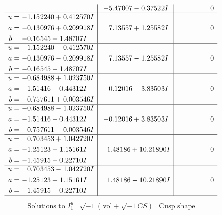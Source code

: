 \documentclass[1p]{elsarticle_modified}
\theoremstyle{definition}
\newcommand{\I}{\sqrt{-1}}
\begin{document}
$$\begin{array}{c|c|c}
 & -5.47007 - 0.37522 I & \phantom{-0.000000 } 0 \\ \hline\begin{aligned}
u &= -1.152240 + 0.412570 I \\
a &= -0.130976 + 0.209918 I \\
b &= -0.16545 + 1.48707 I\end{aligned}
 & \phantom{-}7.13557 + 1.25582 I & \phantom{-0.000000 } 0 \\ \hline\begin{aligned}
u &= -1.152240 - 0.412570 I \\
a &= -0.130976 - 0.209918 I \\
b &= -0.16545 - 1.48707 I\end{aligned}
 & \phantom{-}7.13557 - 1.25582 I & \phantom{-0.000000 } 0 \\ \hline\begin{aligned}
u &= -0.684988 + 1.023750 I \\
a &= -1.51416 + 0.44312 I \\
b &= -0.757611 + 0.003546 I\end{aligned}
 & -0.12016 - 3.83503 I & \phantom{-0.000000 } 0 \\ \hline\begin{aligned}
u &= -0.684988 - 1.023750 I \\
a &= -1.51416 - 0.44312 I \\
b &= -0.757611 - 0.003546 I\end{aligned}
 & -0.12016 + 3.83503 I & \phantom{-0.000000 } 0 \\ \hline\begin{aligned}
u &= \phantom{-}0.703453 + 1.042720 I \\
a &= -1.25123 - 1.15161 I \\
b &= -1.45915 - 0.22710 I\end{aligned}
 & \phantom{-}1.48186 + 10.21890 I & \phantom{-0.000000 } 0 \\ \hline\begin{aligned}
u &= \phantom{-}0.703453 - 1.042720 I \\
a &= -1.25123 + 1.15161 I \\
b &= -1.45915 + 0.22710 I\end{aligned}
 & \phantom{-}1.48186 - 10.21890 I & \phantom{-0.000000 } 0\\
 \hline 
 \end{array}$$\newpage$$\begin{array}{c|c|c}  
\text{Solutions to }I^u_{1}& \I (\text{vol} + \sqrt{-1}CS) & \text{Cusp shape}\\

\end{array}$$
\end{document}
